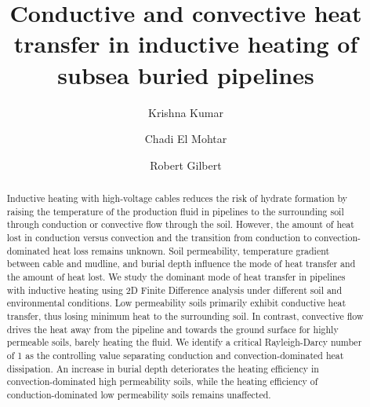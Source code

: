 \documentclass[Journal,letterpaper,InsideFigs]{ascelike-new}
\begin{document}
\title{Conductive and convective heat transfer in inductive heating of subsea buried pipelines}

\author[1]{Krishna Kumar}
\author[2]{Chadi El Mohtar}
\author[2]{Robert Gilbert}


\maketitle

\begin{abstract}
Inductive heating with high-voltage cables reduces the risk of hydrate formation by raising the temperature of the production fluid in pipelines to the surrounding soil through conduction or convective flow through the soil. However, the amount of heat lost in conduction versus convection and the transition from conduction to convection-dominated heat loss remains unknown. Soil permeability, temperature gradient between cable and mudline, and burial depth influence the mode of heat transfer and the amount of heat lost. We study the dominant mode of heat transfer in pipelines with inductive heating using 2D Finite Difference analysis under different soil and environmental conditions. Low permeability soils primarily exhibit conductive heat transfer, thus losing minimum heat to the surrounding soil. In contrast, convective flow drives the heat away from the pipeline and towards the ground surface for highly permeable soils, barely heating the fluid.  We identify a critical Rayleigh-Darcy number of 1 as the controlling value separating conduction and convection-dominated heat dissipation. An increase in burial depth deteriorates the heating efficiency in convection-dominated high permeability soils, while the heating efficiency of conduction-dominated low permeability soils remains unaffected.
\end{abstract}
\end{document}
